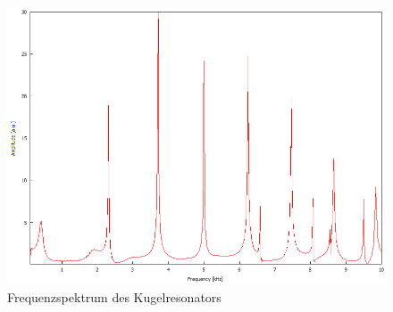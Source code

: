 \begin{figure}
    \caption{Frequenzspektrum des Kugelresonators}
\includegraphics[width = \textwidth]{figure/Kugelresonanzspektrum.png}
\end{figure}

